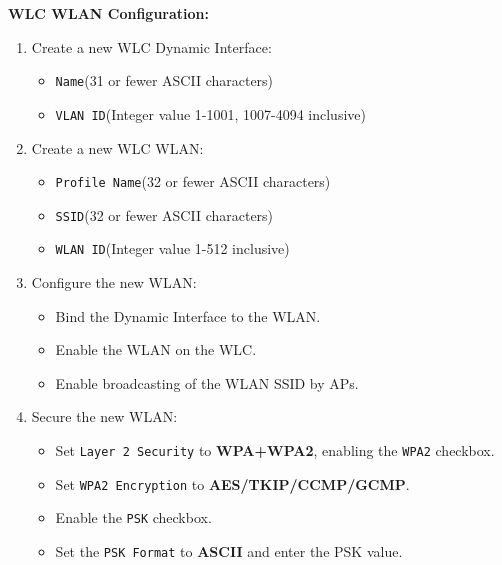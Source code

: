 \documentclass[12pt]{article}
\begin{document}
	\textbf{WLC WLAN Configuration:}
	\begin{enumerate}
		\item{Create a new WLC Dynamic Interface:}
		\begin{itemize} \itemsep -5pt
			\item{\texttt{Name}\hfill(31 or fewer ASCII characters)}
			\item{\texttt{VLAN ID}\hfill(Integer value 1-1001, 1007-4094 inclusive)}
		\end{itemize}
		\item{Create a new WLC WLAN:}
		\begin{itemize} \itemsep -5pt
			\item{\texttt{Profile Name}\hfill(32 or fewer ASCII characters)}
			\item{\texttt{SSID}\hfill(32 or fewer ASCII characters)}
			\item{\texttt{WLAN ID}\hfill(Integer value 1-512 inclusive)}
		\end{itemize}
		\item{Configure the new WLAN:}
		\begin{itemize} \itemsep -5pt
			\item{Bind the Dynamic Interface to the WLAN.}
			\item{Enable the WLAN on the WLC.}
			\item{Enable broadcasting of the WLAN SSID by APs.}
		\end{itemize}
		\item{Secure the new WLAN:}
		\begin{itemize} \itemsep -5pt
			\item{Set \texttt{Layer 2 Security} to \textbf{WPA+WPA2}, enabling the \texttt{WPA2} checkbox.}
			\item{Set \texttt{WPA2 Encryption} to \textbf{AES/TKIP/CCMP/GCMP}.}
			\item{Enable the \texttt{PSK} checkbox.}
			\item{Set the \texttt{PSK Format} to \textbf{ASCII} and enter the PSK value.}
		\end{itemize}
	\end{enumerate}

\end{document}
